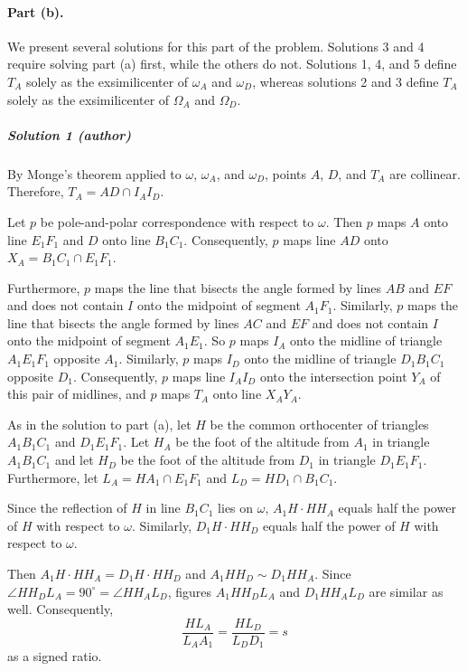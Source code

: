\documentclass[11pt]{scrartcl}
\begin{document}
\paragraph{Part (b).}
We present several solutions for this part of the problem. Solutions 3 and 4
require solving part (a) first, while the others do not. Solutions 1, 4, and 5
define $T_A$ solely as the exsimilicenter of $\omega_A$ and $\omega_D$, whereas
solutions 2 and 3 define $T_A$ solely as the exsimilicenter of $\Omega_A$ and
$\Omega_D$.

\subparagraph{Solution 1 (author)}

By Monge's theorem applied to $\omega$, $\omega_A$, and $\omega_D$,
points $A$, $D$, and $T_A$ are collinear. Therefore, $T_A= AD\cap I_AI_D$.

Let $p$ be pole-and-polar correspondence with respect to $\omega$. Then $p$ maps
$A$ onto line $E_1F_1$ and $D$ onto line $B_1C_1$. Consequently, $p$ maps line
$AD$ onto $X_A=B_1C_1\cap E_1F_1$.

Furthermore, $p$ maps the line that bisects the angle formed by lines $AB$ and
$EF$ and does not contain $I$ onto the midpoint of segment $A_1F_1$. Similarly,
$p$ maps the line that bisects the angle formed by lines $AC$ and $EF$ and does
not contain $I$ onto the midpoint of segment $A_1E_1$. So $p$ maps $I_A$ onto
the midline of triangle $A_1E_1F_1$ opposite $A_1$. Similarly, $p$ maps $I_D$
onto the midline of triangle $D_1B_1C_1$ opposite $D_1$. Consequently, $p$ maps
line $I_AI_D$ onto the intersection point $Y_A$ of this pair of midlines, and
$p$ maps $T_A$ onto line $X_AY_A$.

As in the solution to part (a), let $H$ be the common orthocenter of triangles
$A_1B_1C_1$ and $D_1E_1F_1$. Let $H_A$ be the foot of the altitude from $A_1$ in
triangle $A_1B_1C_1$ and let $H_D$ be the foot of the altitude from $D_1$ in
triangle $D_1E_1F_1$. Furthermore, let $L_A=HA_1\cap E_1F_1$ and $L_D=HD_1\cap
B_1C_1$.

Since the reflection of $H$ in line $B_1C_1$ lies on $\omega$, $A_1H \cdot HH_A$ equals half the power of $H$ with respect to $\omega$. Similarly, $D_1H \cdot HH_D$ equals half the power of $H$ with respect to $\omega$.

Then $A_1H \cdot HH_A = D_1H \cdot HH_D$ and $A_1HH_D\sim D_1HH_A$. Since
$\angle HH_DL_A = 90^\circ = \angle HH_AL_D$, figures $A_1HH_DL_A$ and
$D_1HH_AL_D$ are similar as well. Consequently,
\[
  \frac{HL_A}{L_AA_1}=\frac{HL_D}{L_DD_1}=s
\]
as a signed ratio.
\end{document}
